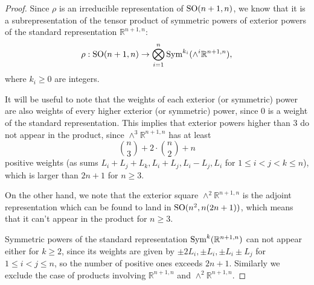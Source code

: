 \documentclass{report}
\begin{document}
\begin{itemize}
\begin{proof}
    Since $\rho$ is an irreducible representation of $\operatorname{{\mathrm{SO}}}(n+1,n)$, we know that it is a subrepresentation of the tensor product of symmetric powers of exterior powers of the standard representation $\mathbb R^{n+1,n}$:
    \[
    \rho: \operatorname{{\mathrm{SO}}}(n+1,n) \to \bigotimes_{i=1}^n \operatorname{Sym}^{k_i}(\wedge^i \mathbb R^{n+1,n}),
    \]
    where $k_i \geq 0$ are integers.

    It will be useful to note that the weights of each exterior (or symmetric) power are also weights of every higher exterior (or symmetric) power, since $0$ is a weight of the standard representation.
    This implies that exterior powers higher than $3$ do not appear in the product, since $\wedge^3 \mathbb R^{n+1,n}$ has at least
    \[
    \binom{n}{3} + 2 \cdot \binom{n}{2} + n 
    \]
    positive weights (as sums $L_i + L_j + L_k, L_i + L_j, L_i - L_j, L_i$ for $1 \leq i < j < k \leq n$), which is larger than $2n+1$ for $n \geq 3$.

    On the other hand, we note that the exterior square $\wedge^2 \mathbb R^{n+1,n}$ is the adjoint representation which can be found to land in $\operatorname{{\mathrm{SO}}}(n^2, n(2n+1))$, which means that it can't appear in the product for $n \geq 3$.

    Symmetric powers of the standard representation $\operatorname{Sym}^k(\mathbb R^{n+1,n})$ can not appear either for $k \geq 2$, since its weights are given by $\pm 2L_i, \pm L_i, \pm L_i \pm L_j$ for $1 \leq i < j \leq n$, so the number of positive ones exceeds $2n+1$.
    Similarly we exclude the case of products involving $\mathbb R^{n+1,n}$ and $\wedge^2 \mathbb R^{n+1,n}$.
\end{proof}
\end{itemize}
\end{document}
